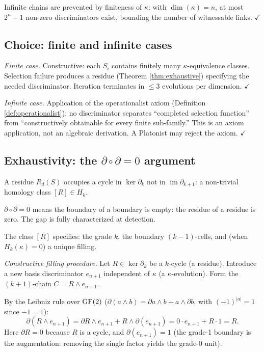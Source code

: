 Infinite chains are prevented by finiteness of $\kappa$:
with $\dim(\kappa) = n$, at most $2^n - 1$ non-zero
discriminators exist, bounding the number of witnessable
links. $\checkmark$

\subsection{Choice: finite and infinite cases}
\label{app:choice-full}

\emph{Finite case.} Constructive: each $S_i$ contains
finitely many $\kappa$-equivalence classes. Selection
failure produces a residue (Theorem \ref{thm:exhaustive})
specifying the needed discriminator. Iteration terminates
in $\leq 3$ evolutions per dimension. $\checkmark$

\emph{Infinite case.} Application of the operationalist
axiom (Definition \ref{def:operationalist}): no
discriminator separates ``completed selection function''
from ``constructively obtainable for every finite
sub-family.'' This is an axiom application, not an
algebraic derivation. A Platonist may reject the
axiom. $\checkmark$

\subsection{Exhaustivity: the $\partial \circ \partial = 0$
  argument}
\label{app:exhaustivity-full}

A residue $R_d(S)$ occupies a cycle in $\ker \partial_k$
not in $\operatorname{im} \partial_{k+1}$: a non-trivial
homology class $[R] \in H_k$.

$\partial \circ \partial = 0$ means the boundary of
a boundary is empty: the residue of a residue is zero.
The gap is fully characterized at detection.

The class $[R]$ specifies: the grade $k$, the boundary
$(k{-}1)$-cells, and (when $H_k(\kappa) = 0$) a unique
filling.

\emph{Constructive filling procedure.}
Let $R \in \ker \partial_k$ be a $k$-cycle (a residue).
Introduce a new basis discriminator $e_{n+1}$ independent
of $\kappa$ (a $\kappa$-evolution). Form the $(k{+}1)$-chain
$C = R \wedge e_{n+1}$.

By the Leibniz rule over $\operatorname{GF}(2)$
($\partial(a \wedge b) = \partial a \wedge b + a \wedge
\partial b$, with $(-1)^{|a|} = 1$ since $-1 = 1$):
\[
  \partial(R \wedge e_{n+1}) = \partial R \wedge e_{n+1}
  + R \wedge \partial(e_{n+1}) = 0 \cdot e_{n+1}
  + R \cdot 1 = R.
\]
Here $\partial R = 0$ because $R$ is a cycle, and
$\partial(e_{n+1}) = 1$ (the grade-1 boundary is the
augmentation: removing the single factor yields the
grade-0 unit).

